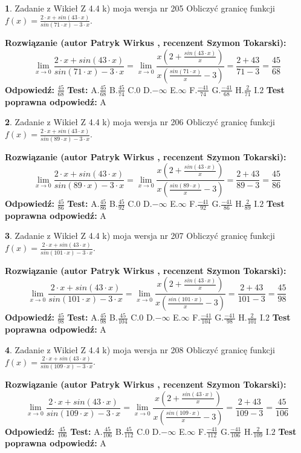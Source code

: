 \documentclass[12pt, a4paper]{article}
\theoremstyle{definition} %
\newtheorem{zad}{}
\newcommand{\zadStart}[1]{\begin{zad}#1\newline}
\newcommand{\zadStop}{\end{zad}}
\newcommand{\rozwStart}[2]{\noindent \textbf{Rozwiązanie (autor #1 , recenzent #2): }\newline}
\newcommand{\rozwStop}{\newline}
\newcommand{\odpStart}{\noindent \textbf{Odpowiedź:}\newline}
\newcommand{\odpStop}{\newline}
\newcommand{\testStart}{\noindent \textbf{Test:}\newline}
\newcommand{\testStop}{\newline}
\newcommand{\kluczStart}{\noindent \textbf{Test poprawna odpowiedź:}\newline}
\newcommand{\kluczStop}{\newline}
\begin{document}
\zadStart{Zadanie z Wikieł Z 4.4 k) moja wersja nr 205}
Obliczyć granicę funkcji $f(x)=\frac{2\cdot x +sin(43\cdot x)}{sin(71\cdot x) -3\cdot x}$.
\zadStop
\rozwStart{Patryk Wirkus}{Szymon Tokarski}
$$\lim\limits_{x\to 0}\frac{2\cdot x +sin(43\cdot x)}{sin(71\cdot x) -3\cdot x}
=\lim\limits_{x\to 0}\frac{x(2+\frac{sin(43\cdot x)}{x})}{x(\frac{sin(71\cdot x)}{x}-3)}
=\frac{2+43}{71-3} = \frac{45}{68}$$
\rozwStop
\odpStart
$\frac{45}{68}$
\odpStop
\testStart
A.$\frac{45}{68}$
B.$\frac{45}{74}$
C.$0$
D.$-\infty$
E.$\infty$
F.$\frac{-41}{74}$
G.$\frac{-41}{68}$
H.$\frac{2}{71}$
I.$2$
\testStop
\kluczStart
A
\kluczStop



\zadStart{Zadanie z Wikieł Z 4.4 k) moja wersja nr 206}
Obliczyć granicę funkcji $f(x)=\frac{2\cdot x +sin(43\cdot x)}{sin(89\cdot x) -3\cdot x}$.
\zadStop
\rozwStart{Patryk Wirkus}{Szymon Tokarski}
$$\lim\limits_{x\to 0}\frac{2\cdot x +sin(43\cdot x)}{sin(89\cdot x) -3\cdot x}
=\lim\limits_{x\to 0}\frac{x(2+\frac{sin(43\cdot x)}{x})}{x(\frac{sin(89\cdot x)}{x}-3)}
=\frac{2+43}{89-3} = \frac{45}{86}$$
\rozwStop
\odpStart
$\frac{45}{86}$
\odpStop
\testStart
A.$\frac{45}{86}$
B.$\frac{45}{92}$
C.$0$
D.$-\infty$
E.$\infty$
F.$\frac{-41}{92}$
G.$\frac{-41}{86}$
H.$\frac{2}{89}$
I.$2$
\testStop
\kluczStart
A
\kluczStop



\zadStart{Zadanie z Wikieł Z 4.4 k) moja wersja nr 207}
Obliczyć granicę funkcji $f(x)=\frac{2\cdot x +sin(43\cdot x)}{sin(101\cdot x) -3\cdot x}$.
\zadStop
\rozwStart{Patryk Wirkus}{Szymon Tokarski}
$$\lim\limits_{x\to 0}\frac{2\cdot x +sin(43\cdot x)}{sin(101\cdot x) -3\cdot x}
=\lim\limits_{x\to 0}\frac{x(2+\frac{sin(43\cdot x)}{x})}{x(\frac{sin(101\cdot x)}{x}-3)}
=\frac{2+43}{101-3} = \frac{45}{98}$$
\rozwStop
\odpStart
$\frac{45}{98}$
\odpStop
\testStart
A.$\frac{45}{98}$
B.$\frac{45}{104}$
C.$0$
D.$-\infty$
E.$\infty$
F.$\frac{-41}{104}$
G.$\frac{-41}{98}$
H.$\frac{2}{101}$
I.$2$
\testStop
\kluczStart
A
\kluczStop



\zadStart{Zadanie z Wikieł Z 4.4 k) moja wersja nr 208}
Obliczyć granicę funkcji $f(x)=\frac{2\cdot x +sin(43\cdot x)}{sin(109\cdot x) -3\cdot x}$.
\zadStop
\rozwStart{Patryk Wirkus}{Szymon Tokarski}
$$\lim\limits_{x\to 0}\frac{2\cdot x +sin(43\cdot x)}{sin(109\cdot x) -3\cdot x}
=\lim\limits_{x\to 0}\frac{x(2+\frac{sin(43\cdot x)}{x})}{x(\frac{sin(109\cdot x)}{x}-3)}
=\frac{2+43}{109-3} = \frac{45}{106}$$
\rozwStop
\odpStart
$\frac{45}{106}$
\odpStop
\testStart
A.$\frac{45}{106}$
B.$\frac{45}{112}$
C.$0$
D.$-\infty$
E.$\infty$
F.$\frac{-41}{112}$
G.$\frac{-41}{106}$
H.$\frac{2}{109}$
I.$2$
\testStop
\kluczStart
A
\kluczStop
\end{document}
